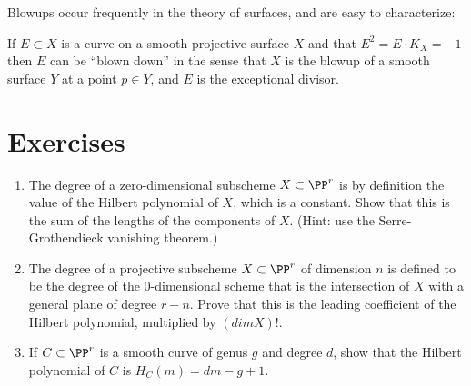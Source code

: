 Blowups occur frequently in the theory of surfaces, and are easy to characterize:
\begin{theorem}
If $E\subset X$ is a curve on a smooth projective surface $X$ and
 that $E^2 = E\cdot K_X = -1$ then $E$ can be ``blown down'' in the sense that
 $X$ is the blowup of a smooth surface $Y$ at a point $p\in Y$, and $E$ is the exceptional divisor.
\end{theorem}


\section{Exercises}


\begin{exercise}\label{characterization of degree}
\begin{enumerate}
\item The degree of a zero-dimensional subscheme $X\subset \PP^r$ is by definition the value of the Hilbert polynomial of $X$, which is a constant. Show that
this is the sum of the lengths of the components of $X$. (Hint: use the Serre-Grothendieck vanishing theorem.)

\item The degree of a projective subscheme $X\subset \PP^r$ of dimension $n$ is defined to be the degree of the $0$-dimensional scheme
that is the intersection of $X$ with a general plane of degree $r-n$. Prove that this is the leading coefficient of the Hilbert polynomial, multiplied
by $(dim X)!$.

\item If $C\subset \PP^r$ is a smooth curve of genus $g$ and degree $d$, show that the Hilbert polynomial of $C$ is $H_C(m) = dm-g+1$.
\end{enumerate}
\end{exercise}

